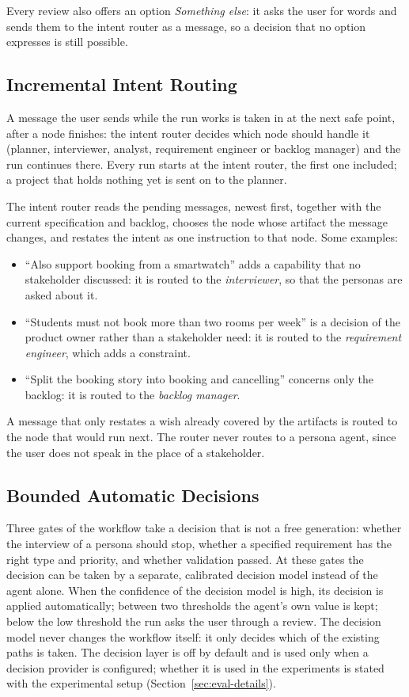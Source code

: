 Every review also offers an option \emph{Something else}: it asks the user for words and sends them to the intent router as a message, so a decision that no option expresses is still possible.

\subsection{Incremental Intent Routing}
\label{sec:pa-intent-router}
A message the user sends while the run works is taken in at the next safe point, after a node finishes: the intent router decides which node should handle it (planner, interviewer, analyst, requirement engineer or backlog manager) and the run continues there. Every run starts at the intent router, the first one included; a project that holds nothing yet is sent on to the planner.

The intent router reads the pending messages, newest first, together with the current specification and backlog, chooses the node whose artifact the message changes, and restates the intent as one instruction to that node. Some examples:
\begin{itemize}
    \item ``Also support booking from a smartwatch'' adds a capability that no stakeholder discussed: it is routed to the \emph{interviewer}, so that the personas are asked about it.
    \item ``Students must not book more than two rooms per week'' is a decision of the product owner rather than a stakeholder need: it is routed to the \emph{requirement engineer}, which adds a constraint.
    \item ``Split the booking story into booking and cancelling'' concerns only the backlog: it is routed to the \emph{backlog manager}.
\end{itemize}
A message that only restates a wish already covered by the artifacts is routed to the node that would run next. The router never routes to a persona agent, since the user does not speak in the place of a stakeholder.

\subsection{Bounded Automatic Decisions}
\label{sec:pa-decisions}

Three gates of the workflow take a decision that is not a free generation: whether the interview of a persona should stop, whether a specified requirement has the right type and priority, and whether validation passed. At these gates the decision can be taken by a separate, calibrated decision model instead of the agent alone. When the confidence of the decision model is high, its decision is applied automatically; between two thresholds the agent's own value is kept; below the low threshold the run asks the user through a review. The decision model never changes the workflow itself: it only decides which of the existing paths is taken. The decision layer is off by default and is used only when a decision provider is configured; whether it is used in the experiments is stated with the experimental setup (Section~\ref{sec:eval-details}).

